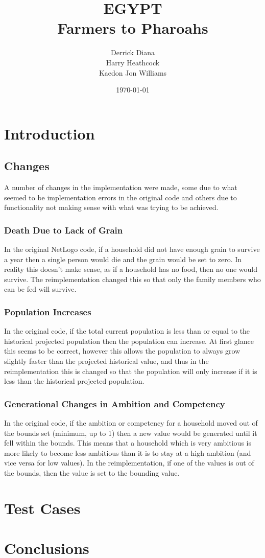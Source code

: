 \documentclass[12pt]{article}
\title{EGYPT\\Farmers to Pharoahs}
\author{Derrick Diana\\Harry Heathcock\\Kaedon Jon Williams}
\date{\today}
\begin{document}
	\maketitle
	\begin{abstract}
			
	\end{abstract}
	
	\section{Introduction}
		\subsection{Changes}
			A number of changes in the implementation were made, some due to what seemed to be implementation errors in the original code and others due to functionality not making sense with what was trying to be achieved.
			\subsubsection{Death Due to Lack of Grain}
				In the original NetLogo code, if a household did not have enough grain to survive a year then a single person would die and the grain would be set to zero. In reality this doesn't make sense, as if a household has no food, then no one would survive. The reimplementation changed this so that only the family members who can be fed will survive.\\
			\subsubsection{Population Increases}
				In the original code, if the total current population is less than or equal to the historical projected population then the population can increase. At first glance this seems to be correct, however this allows the population to always grow slightly faster than the projected historical value, and thus in the reimplementation this is changed so that the population will only increase if it is less than the historical projected population.
			\subsubsection{Generational Changes in Ambition and Competency}
				In the original code, if the ambition or competency for a household moved out of the bounds set (minimum, up to 1) then a new value would be generated until it fell within the bounds. This means that a household which is very ambitious is more likely to become less ambitious than it is to stay at a high ambition (and vice versa for low values). In the reimplementation, if one of the values is out of the bounds, then the value is set to the bounding value.
			
	\section{Test Cases}

	\section{Conclusions}
	
	\begin{thebibliography}{9}

	\end{thebibliography}
\end{document}
